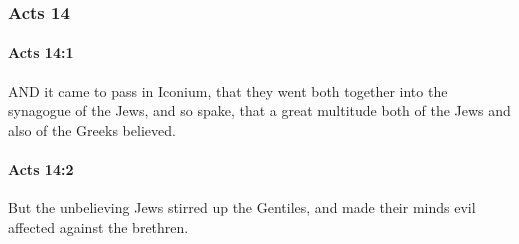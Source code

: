 	\subsubsection{Acts 14} %
		\label{ACTS-14}
		
		\paragraph{Acts 14:1} %
			\label{ACTS-14-1}

			AND it came to pass in Iconium, that they went both together into the synagogue of the Jews, and so spake, that a great multitude both of the Jews and also of the Greeks believed.

			\begin{framed}
			\scriptsize
				\begin{compactdesc}
					\item[SBLG] 
				\end{compactdesc}
			\end{framed}

		\paragraph{Acts 14:2} %
			\label{ACTS-14-2}

			But the unbelieving Jews stirred up the Gentiles, and made their minds evil affected against the brethren.

